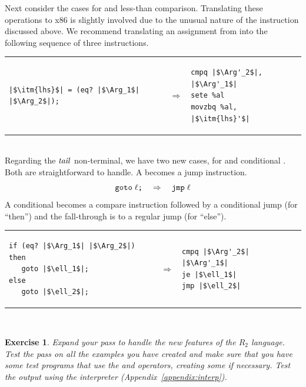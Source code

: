 \documentclass[11pt]{book}
\newtheorem{exercise}[theorem]{Exercise}
\begin{document}
Next consider the cases for  and less-than comparison.
Translating these operations to x86 is slightly involved due to the
unusual nature of the  instruction discussed above.  We
recommend translating an assignment from  into the following
sequence of three instructions. \\
\begin{tabular}{lll}
\begin{minipage}{0.4\textwidth}
\begin{lstlisting}
|$\itm{lhs}$| = (eq? |$\Arg_1$| |$\Arg_2$|);
\end{lstlisting}
\end{minipage}
&
$\Rightarrow$
&
\begin{minipage}{0.4\textwidth}
\begin{lstlisting}
cmpq |$\Arg'_2$|, |$\Arg'_1$|
sete %al
movzbq %al, |$\itm{lhs}'$|
\end{lstlisting}
\end{minipage}
\end{tabular}  \\

Regarding the $\mathit{tail}$ non-terminal, we have two new cases, for
 and conditional . Both are straightforward
to handle. A  becomes a jump instruction.
\[
\texttt{goto}\; \ell\texttt{;} \quad \Rightarrow \quad \texttt{jmp}\;\ell
\]
A conditional  becomes a compare instruction followed
by a conditional jump (for ``then'') and the fall-through is
to a regular jump (for ``else'').\\
\begin{tabular}{lll}
\begin{minipage}{0.4\textwidth}
\begin{lstlisting}
if (eq? |$\Arg_1$| |$\Arg_2$|) then
   goto |$\ell_1$|;
else
   goto |$\ell_2$|;
\end{lstlisting}
\end{minipage}
&
$\Rightarrow$
&
\begin{minipage}{0.4\textwidth}
\begin{lstlisting}
cmpq |$\Arg'_2$| |$\Arg'_1$|
je |$\ell_1$|
jmp |$\ell_2$|
\end{lstlisting}
\end{minipage}
\end{tabular}  \\

\begin{exercise}\normalfont
Expand your  pass to handle the new features
of the $R_2$ language. Test the pass on all the examples you have
created and make sure that you have some test programs that use the
 and \code{<} operators, creating some if necessary. Test
the output using the  interpreter
(Appendix~\ref{appendix:interp}).
\end{exercise}
\end{document}

